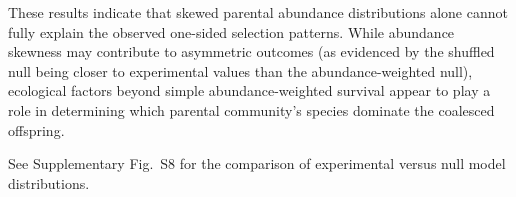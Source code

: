 These results indicate that skewed parental abundance distributions alone cannot fully explain the observed one-sided selection patterns. While abundance skewness may contribute to asymmetric outcomes (as evidenced by the shuffled null being closer to experimental values than the abundance-weighted null), ecological factors beyond simple abundance-weighted survival appear to play a role in determining which parental community's species dominate the coalesced offspring.

See Supplementary Fig.~S8 for the comparison of experimental versus null model distributions.
